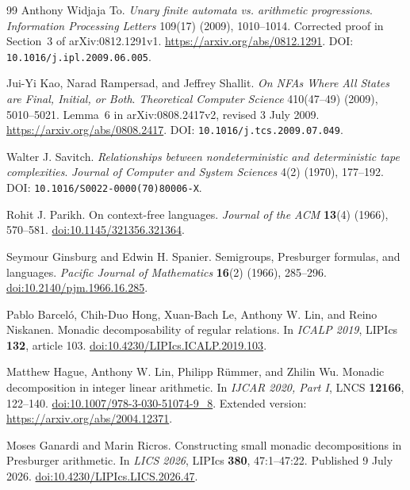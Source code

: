\documentclass[11pt,letterpaper]{article}
\theoremstyle{definition}
\theoremstyle{remark}
\begin{document}
\begin{thebibliography}{99}
Anthony Widjaja To.
\emph{Unary finite automata vs. arithmetic progressions}.
\emph{Information Processing Letters} 109(17) (2009), 1010--1014.
Corrected proof in Section~3 of arXiv:0812.1291v1.
\url{https://arxiv.org/abs/0812.1291}.
DOI: \nolinkurl{10.1016/j.ipl.2009.06.005}.

Jui-Yi Kao, Narad Rampersad, and Jeffrey Shallit.
\emph{On NFAs Where All States are Final, Initial, or Both}.
\emph{Theoretical Computer Science} 410(47--49) (2009), 5010--5021.
Lemma~6 in arXiv:0808.2417v2, revised 3 July 2009.
\url{https://arxiv.org/abs/0808.2417}.
DOI: \nolinkurl{10.1016/j.tcs.2009.07.049}.

Walter J. Savitch.
\emph{Relationships between nondeterministic and deterministic tape
complexities}.
\emph{Journal of Computer and System Sciences} 4(2) (1970), 177--192.
DOI: \nolinkurl{10.1016/S0022-0000(70)80006-X}.

Rohit J. Parikh.
On context-free languages.
\emph{Journal of the ACM} \textbf{13}(4) (1966), 570--581.
\href{https://doi.org/10.1145/321356.321364}{doi:10.1145/321356.321364}.

Seymour Ginsburg and Edwin H. Spanier.
Semigroups, Presburger formulas, and languages.
\emph{Pacific Journal of Mathematics} \textbf{16}(2) (1966), 285--296.
\href{https://doi.org/10.2140/pjm.1966.16.285}{doi:10.2140/pjm.1966.16.285}.

Pablo Barcel\'o, Chih-Duo Hong, Xuan-Bach Le, Anthony W. Lin, and Reino Niskanen.
Monadic decomposability of regular relations.
In \emph{ICALP 2019}, LIPIcs \textbf{132}, article 103.
\href{https://doi.org/10.4230/LIPIcs.ICALP.2019.103}{doi:10.4230/LIPIcs.ICALP.2019.103}.

Matthew Hague, Anthony W. Lin, Philipp R\"ummer, and Zhilin Wu.
Monadic decomposition in integer linear arithmetic.
In \emph{IJCAR 2020, Part I}, LNCS \textbf{12166}, 122--140.
\href{https://doi.org/10.1007/978-3-030-51074-9_8}{doi:10.1007/978-3-030-51074-9\_8}.
Extended version: \url{https://arxiv.org/abs/2004.12371}.

Moses Ganardi and Marin Ricros.
Constructing small monadic decompositions in Presburger arithmetic.
In \emph{LICS 2026}, LIPIcs \textbf{380}, 47:1--47:22.
Published 9 July 2026.
\href{https://doi.org/10.4230/LIPIcs.LICS.2026.47}{doi:10.4230/LIPIcs.LICS.2026.47}.


\end{thebibliography}
\end{document}
